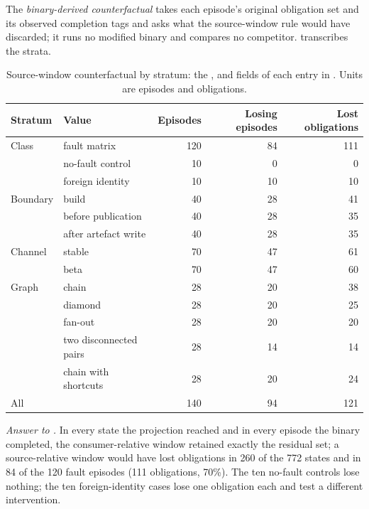 The \emph{binary-derived counterfactual} takes each episode's original
obligation set and its observed completion tags and asks what the
source-window rule would have discarded; it runs no modified binary and
compares no competitor.  transcribes the strata.

\begin{table}[ht]
\centering\footnotesize
\caption{Source-window counterfactual by stratum: the ,
 and 
fields of each  entry in
\protect{}.
Units are episodes and obligations.}
\label{tab:eval:counterfactual}
\begin{tabular}{@{}llrrr@{}}
\toprule
Stratum & Value & Episodes & Losing episodes & Lost obligations \\
\midrule
Class & fault matrix & 120 & 84 & 111 \\
      & no-fault control & 10 & 0 & 0 \\
      & foreign identity & 10 & 10 & 10 \\
\midrule
Boundary & build & 40 & 28 & 41 \\
         & before publication & 40 & 28 & 35 \\
         & after artefact write & 40 & 28 & 35 \\
\midrule
Channel & stable & 70 & 47 & 61 \\
        & beta & 70 & 47 & 60 \\
\midrule
Graph & chain & 28 & 20 & 38 \\
      & diamond & 28 & 20 & 25 \\
      & fan-out & 28 & 20 & 20 \\
      & two disconnected pairs & 28 & 14 & 14 \\
      & chain with shortcuts & 28 & 20 & 24 \\
\midrule
All & & 140 & 94 & 121 \\
\bottomrule
\end{tabular}
\end{table}

\emph{Answer to .} In every state the projection reached and in every
episode the binary completed, the consumer-relative window retained exactly the
residual set; a source-relative window would have lost obligations in 260 of
the 772 states and in 84 of the 120 fault episodes (111 obligations, 70\%).
The ten no-fault controls lose nothing; the ten foreign-identity cases lose
one obligation each and test a different intervention.

